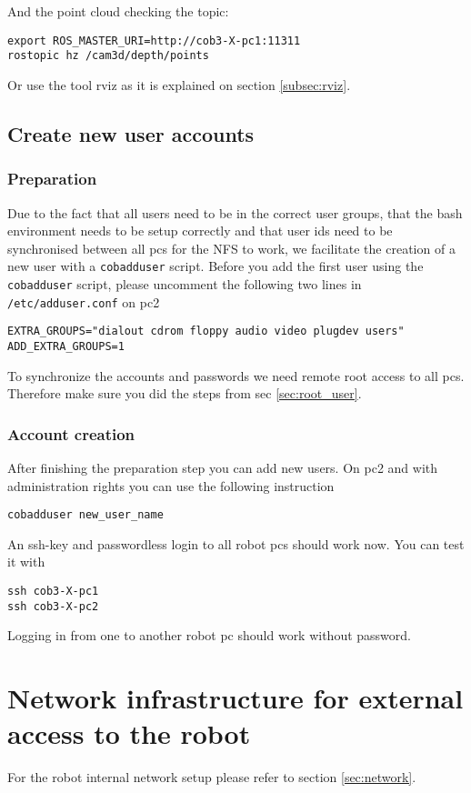 And the point cloud checking the topic:
\begin{lstlisting}
export ROS_MASTER_URI=http://cob3-X-pc1:11311
rostopic hz /cam3d/depth/points
\end{lstlisting}

Or use the tool rviz as it is explained on section \ref{subsec:rviz}.

\subsection{Create new user accounts}
\subsubsection{Preparation}
\label{sec:account}
Due to the fact that all users need to be in the correct user groups, that the bash environment needs to be setup correctly and that user ids need to be synchronised between all pcs for the NFS to work, we facilitate the creation of a new user with a \texttt{cobadduser} script. Before you add the first user using the \texttt{cobadduser} script, please uncomment the following two lines in \texttt{/etc/adduser.conf} on pc2
\begin{lstlisting}
EXTRA_GROUPS="dialout cdrom floppy audio video plugdev users"
ADD_EXTRA_GROUPS=1
\end{lstlisting}

To synchronize the accounts and passwords we need remote root access to all pcs. Therefore make sure you did the steps from sec \ref{sec:root_user}.

\subsubsection{Account creation}
After finishing the preparation step you can add new users. On pc2 and with administration rights you can use the following instruction
\begin{lstlisting}
cobadduser new_user_name
\end{lstlisting}

An ssh-key and passwordless login to all robot pcs should work now. You can test it with
\begin{lstlisting}
ssh cob3-X-pc1
ssh cob3-X-pc2
\end{lstlisting}
Logging in from one to another robot pc should work without password.

\section{Network infrastructure for external access to the robot}
For the robot internal network setup please refer to section \ref{sec:network}.

